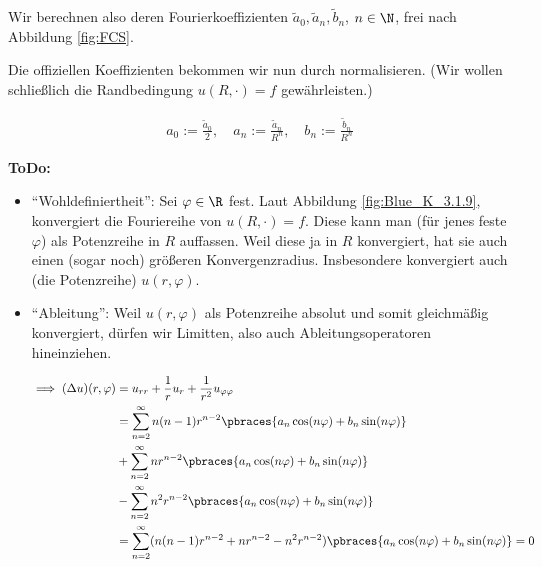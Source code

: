\begin{solution}
\begin{enumerate}[label = (\roman*)]

    Wir berechnen also deren Fourierkoeffizienten $\tilde{a}_0, \tilde{a}_n, \tilde{b}_n$, $n \in \N$, frei nach Abbildung \ref{fig:FCS}.


    Die offiziellen Koeffizienten bekommen wir nun durch normalisieren.
    (Wir wollen schließlich die Randbedingung $u(R, \cdot) = f$ gewährleisten.)

    \begin{align*}
        a_0 := \frac{\tilde{a}_0}{2}, \quad a_n := \frac{\tilde{a}_n}{R^n},
        \quad
        b_n := \frac{\tilde{b}_n}{R^n}
    \end{align*}

    \textbf{ToDo:}
    \begin{itemize}

        \item \enquote{Wohldefiniertheit}:
        Sei $\varphi \in \R$ fest.
        Laut Abbildung \ref{fig:Blue_K_3.1.9}, konvergiert die Fouriereihe von $u(R, \cdot) = f$.
        Diese kann man (für jenes feste $\varphi$) als Potenzreihe in $R$ auffassen.
        Weil diese ja in $R$ konvergiert, hat sie auch einen (sogar noch) größeren Konvergenzradius.
        Insbesondere konvergiert auch (die Potenzreihe) $u(r, \varphi)$.

        \item \enquote{Ableitung}:
        Weil $u(r, \varphi)$ als Potenzreihe absolut und somit gleichmäßig konvergiert, dürfen wir Limitten, also auch Ableitungsoperatoren hineinziehen.

        \begin{align*}
            \implies
            (\Delta u)(r, \varphi)
            & =
            u_{rr} + \frac{1}{r} u_r + \frac{1}{r^2} u_{\varphi \varphi} \\
            & =
            \sum_{n=2}^\infty
            n (n-1) r^{n-2}
            \pbraces
            {
                a_n \cos(n \varphi)
                +
                b_n \sin(n \varphi)
            } \\
            & +
            \sum_{n=2}^\infty
            n r^{n-2}
            \pbraces
            {
                a_n \cos(n \varphi)
                +
                b_n \sin(n \varphi)
            } \\
            & -
            \sum_{n=2}^\infty
            n^2 r^{n-2}
            \pbraces
            {
                a_n \cos(n \varphi)
                +
                b_n \sin(n \varphi)
            } \\
            & =
            \sum_{n=2}^\infty
            (
                n (n-1) r^{n-2}
                +
                n r^{n-2}
                -
                n^2 r^{n-2}
            )
            \pbraces
            {
                a_n \cos(n \varphi)
                +
                b_n \sin(n \varphi)
            }
            = 0
        \end{align*}


\end{itemize}
\end{enumerate}
\end{solution}
